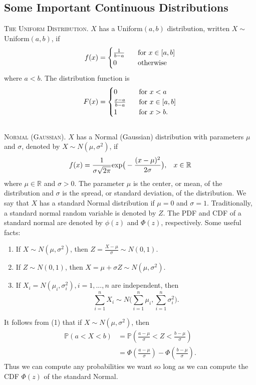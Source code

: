 \documentclass{article}
\theoremstyle{remark}
\newcommand{\1}{\mathbf{1}}
\newcommand{\Prob}{\mathbb{P}}
\newcommand{\R}{\mathbb{R}}
\begin{document}
\subsection{Some Important Continuous Distributions}
\textsc{The Uniform Distribution}. $X$ has a Uniform$(a,b)$ distribution, written $X \sim$ Uniform$(a,b)$, if
\[
f(x) = \begin{cases}
\frac{1}{b-a} \hspace{3mm} &\text{for } x \in [a,b] \\
0 \hspace{3mm} &\text{otherwise}
\end{cases}
\]
where $a<b$. The distribution function is
\[
F(x) = \begin{cases}
0 \hspace{3mm} &\text{for } x<a \\
\frac{x-a}{b-a} \hspace{3mm} &\text{for } x \in [a,b] \\
1 \hspace{3mm} &\text{for } x>b.
\end{cases}
\]\\

\noindent\textsc{Normal (Gaussian)}. $X$ has a Normal (Gaussian) distribution with parameters $\mu$ and $\sigma$, denoted by $X \sim N(\mu, \sigma^2)$, if 
\[
f(x) = \frac{1}{\sigma\sqrt{2 \pi}} \text{exp}\big(-\frac{(x-\mu)^2}{2 \sigma}\big), \hspace{3mm} x\in\R
\]
where $\mu \in \R$ and $\sigma > 0$. The parameter $\mu$ is the center, or mean, of the distribution and $\sigma$ is the spread, or standard deviation, of the distribution. We say that $X$ has a standard Normal distribution if $\mu = 0$ and $\sigma = 1$. Traditionally, a standard normal random variable is denoted by $Z$. The PDF and CDF of a standard normal are denoted by $\phi(z)$ and $\Phi(z)$, respectively. Some useful facts:
\begin{enumerate}
	\item If $X \sim N(\mu,\sigma^2)$, then $Z = \frac{X-\mu}{\sigma} \sim N(0,1)$.
	\item If $Z \sim N(0,1)$, then $X = \mu + \sigma Z \sim N(\mu, \sigma^2)$.
	\item If $X_i = N(\mu_i, \sigma_i^2), i=1,...,n$ are independent, then 
	\[
	\sum_{i=1}^{n}X_i \sim N\big(\sum_{i=1}^{n}\mu_i,\sum_{i=1}^{n}\sigma_i^2\big).
		\]
\end{enumerate}

It follows from (1) that if $X \sim N(\mu,\sigma^2)$, then 
\[
\begin{split}
\Prob(a < X <b) 	&= \Prob(\frac{a-\mu}{\sigma} < Z < \frac{b-\mu}{\sigma}) \\
&= \Phi(\frac{a-\mu}{\sigma}) - \Phi(\frac{b-\mu}{\sigma}). 
\end{split}
\]
Thus we can compute any probabilities we want so long as we can compute the CDF $\Phi(z)$ of the standard Normal. \\
\end{document}
